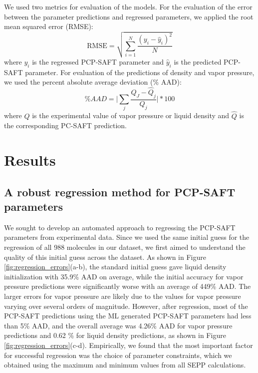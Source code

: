 We used two metrics for evaluation of the models. For the evaluation of the error between the parameter predictions and regressed parameters, we applied the root mean squared error (RMSE):
\begin{equation}
    \text{RMSE} = \sqrt{\sum_{i=1}^N \frac{(y_i - \hat y_i)^2}{N}}
\end{equation}
where $y_i$ is the regressed PCP-SAFT parameter and $\hat y_i$ is the predicted PCP-SAFT parameter. For evaluation of the predictions of density and vapor pressure, we used the percent absolute average deviation (\% AAD):
\begin{equation}
    \% AAD = \biggl \vert \sum_j\frac{Q_J - \hat Q_j}{Q_j} \biggr \vert * 100
\end{equation}
where $Q$ is the experimental value of vapor pressure or liquid density and $\hat Q$ is the corresponding PC-SAFT prediction.


\section{Results}

\subsection{A robust regression method for PCP-SAFT parameters}

We sought to develop an automated approach to regressing the PCP-SAFT parameters from experimental data. Since we used the same initial guess for the regression of all 988 molecules in our dataset, we first aimed to understand the quality of this initial guess across the dataset. As shown in Figure \ref{fig:regression_errors}(a-b), the standard initial guess gave liquid density initialization with 35.9\% AAD on average, while the initial accuracy for vapor pressure predictions were significantly worse with an average of 449\% AAD. The larger errors for vapor pressure are likely due to the values for vapor pressure varying over several orders of magnitude. However, after regression, most of the PCP-SAFT predictions using the ML generated PCP-SAFT parameters had less than 5\% AAD, and the overall average was 4.26\% AAD for vapor pressure predictions and 0.62 \% for liquid density predictions, as shown in Figure \ref{fig:regression_errors}(c-d). Empirically, we found that the most important factor for successful regression was the choice of parameter constraints, which we obtained using the maximum and minimum values from all SEPP calculations.

